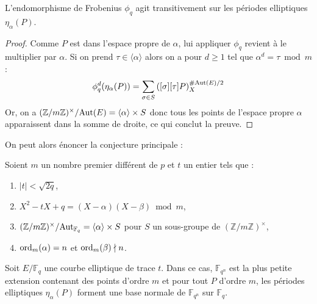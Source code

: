 \documentclass[a4paper]{article} %
\numberwithin{section}{part}
\numberwithin{equation}{section}
\newcommand\zmodninv[1]{(\mathbb{Z}/#1\mathbb{Z})^{\times}}
\newcommand\GF[1]{\mathbb{F}_{#1}}
\newcommand\groupgen[1]{\langle{#1}\rangle}
\newcommand\ord[2]{\textup{ord}_{#1}(#2)}
\begin{document}
\begin{prop}
L'endomorphisme de Frobenius $\phi_q$ agit transitivement sur les périodes 
elliptiques $\eta_{\alpha}(P)$.
\end{prop}
\begin{proof}
Comme $P$ est dans l'espace propre de $\alpha$, lui appliquer 
$\phi_q$ revient à le multiplier par $\alpha$. Si on prend 
$\tau\in\groupgen{\alpha}$ alors on a pour $d\geq1$ tel que $\alpha^d = \tau 
\bmod m$ :
\begin{equation}
\phi_q^d(\eta_{\alpha}(P)) = \sum_{\sigma\in
S}{\left([\sigma][\tau]P\right)_X^{\#\textup{Aut}(E)/2}}
\end{equation}
Or, on a $\zmodninv{m}/\textup{Aut}(E) = \groupgen{\alpha} \times S$ donc
tous les points de l'espace propre $\alpha$ apparaissent dans la somme de
droite, ce qui conclut la preuve.
\end{proof}
On peut alors énoncer la conjecture principale :
\begin{conj}
\label{conj:gaussellnorm}
Soient $m$ un nombre premier différent de $p$ et $t$ un entier tels que :
\vspace{0.3cm}
\begin{enumerate}[1.]
    \item $|t| < \sqrt{2q}$,
    \item $X^2 - tX + q = (X - \alpha)(X - \beta)\bmod{m}$,
    \item $\zmodninv{m}/\textup{Aut}_{\GF{q}} = \groupgen{\alpha}\times S$ pour
    $S$ un sous-groupe de $\zmodninv{m}$,
    \item $\ord{m}{\alpha} = n$ et $\ord{m}{\beta}\nmid n$.
\end{enumerate}
\vspace{0.3cm}
Soit $E/\GF{q}$ une courbe elliptique de trace $t$. Dans ce cas, $\GF{q^n}$ est
la plus petite extension contenant des points d'ordre $m$ et pour tout $P$ 
d'ordre $m$, les périodes elliptiques $\eta_{\alpha}(P)$ forment une base
normale de $\GF{q^n}$ sur $\GF{q}$.\par
\end{conj}
\end{document}
